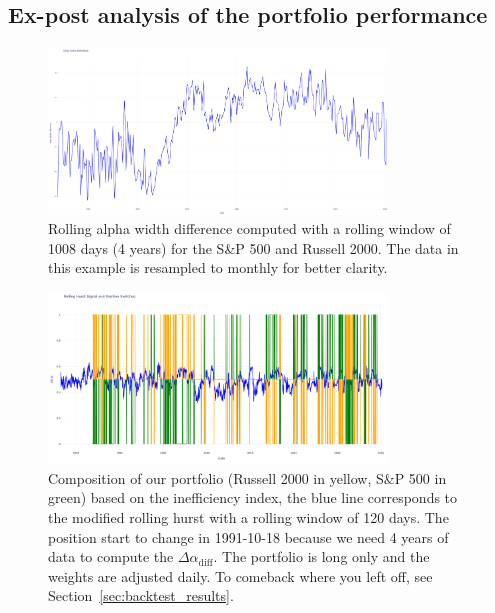 \documentclass[11pt]{extarticle}
\begin{document}
\subsection{Ex-post analysis of the portfolio performance}

\begin{figure}[ht]
    \centering
    \includegraphics[width=0.8\textwidth]{img/delta_alpha_resample_m.png}
    \caption{Rolling alpha width difference computed with a rolling window of 1008 days (4 years)
        for the S\&P 500 and Russell 2000. The data in this example is resampled to monthly for better clarity.}
    \label{fig:rolling_alpha_width}
\end{figure}
\FloatBarrier


\begin{figure}[ht]
    \centering
    \includegraphics[width=0.8\textwidth]{img/position_switching.png}
    \caption{Composition of our portfolio
        (Russell 2000 in yellow, S\&P 500 in green) based on the inefficiency index, the blue line corresponds to the
        modified rolling hurst with a rolling window of 120 days. The position start to change in 1991-10-18 because we need
        4 years of data to compute the $\Delta\alpha_{\text{diff}}$. The portfolio is long only and the weights are adjusted daily.
        To comeback where you left off, see Section~\ref{sec:backtest_results}.}
    \label{fig:position_switching}
\end{figure}
\FloatBarrier
\end{document}

